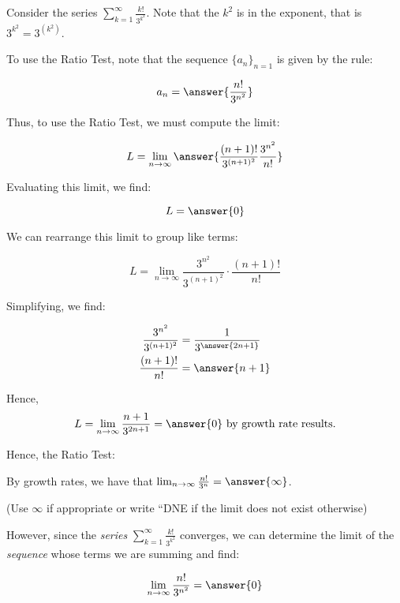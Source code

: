 \documentclass{ximera}
\author{Jim Talamo}
\begin{document}
\begin{exercise}
Consider the series $\sum_{k=1}^{\infty} \frac{k!}{3^{k^2}}$.  Note that the $k^2$ is in the exponent, that is $3^{k^2} = 3^{(k^2)}$.

To use the Ratio Test, note that the sequence $\{a_n\}_{n=1}$ is given by the rule:

\[
a_n = \answer{\frac{n!}{3^{n^2}}}
\]

Thus, to use the Ratio Test, we must compute the limit:

\[
L = \lim_{n \to \infty} \answer{\frac{(n+1)!}{3^{(n+1)^2}}  \frac{3^{n^2}}{n!}}
\]

Evaluating this limit, we find:

\[
L = \answer{0}
\]

\begin{hint}
\begin{question}
We can rearrange this limit to group like terms:

\[
L = \lim_{n \to \infty} \frac{3^{n^2}}{3^{(n+1)^2}} \cdot  \frac{(n+1)!}{n!}
\]

Simplifying, we find:

\begin{align*}
 \frac{3^{n^2}}{3^{(n+1)^2}} &=  \frac{1}{3^{\answer{2n+1}}} \\
 \frac{(n+1)!}{n!} &= \answer{n+1}
\end{align*} 

\begin{question}
Hence, 
\[
L = \lim_{n \to \infty} \frac{n+1}{3^{2n+1}} = \answer{0} \textrm{ by growth rate results.}
\]
\end{question}
\end{question}
\end{hint}

Hence, the Ratio Test:
\begin{multipleChoice}
\end{multipleChoice}

\begin{exercise}
By growth rates, we have that $\lim_{n \to \infty} \frac{n!}{3^n} = \answer{\infty}$.

(Use $\infty$ if appropriate or write ``DNE if the limit does not exist otherwise)

However, since the \emph{series} $\sum_{k=1}^{\infty} \frac{k!}{3^{k^2}}$ converges, we can determine the limit of the \emph{sequence} whose terms we are summing and find:

\[
\lim_{n \to \infty} \frac{n!}{3^{n^2}} = \answer{0}
\]

\end{exercise}

\end{exercise}
\end{document}
